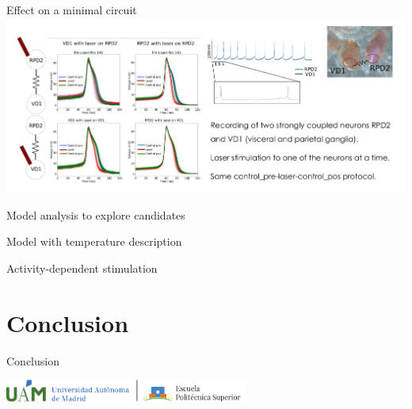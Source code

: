 \documentclass[aspectratio=43]{beamer}
\begin{document}
\begin{frame}{Effect on a minimal circuit}
	\includegraphics[width=\textwidth]{Images/electrical.png}
\end{frame}


\begin{frame}{Model analysis to explore candidates}
\end{frame}

\begin{frame}{Model with temperature description}
\end{frame}


\begin{frame}{Activity-dependent stimulation}
\end{frame}


\section{Conclusion}

    \begin{frame}{Conclusion}
    \end{frame}
\begin{frame}[plain,t]
\vspace{100pt}
\centering
\includegraphics[width=0.6\textwidth]{logos/UAM+EPS_L-eps-converted-to.pdf}
\end{frame}
\end{document}
